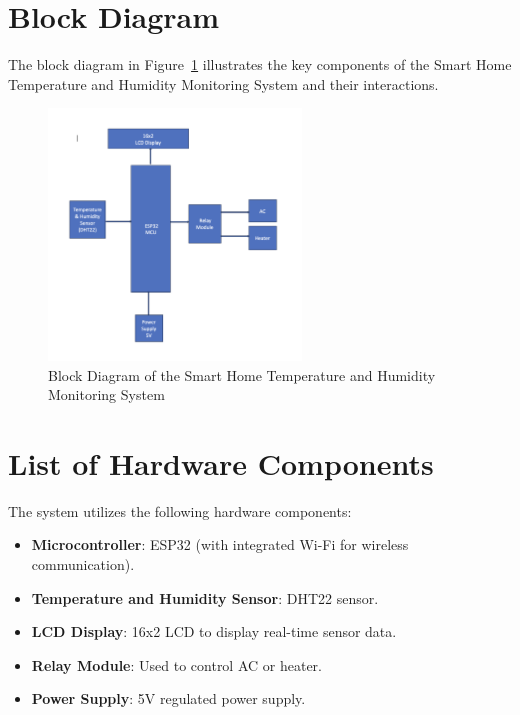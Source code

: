 \documentclass[a4paper,12pt]{article}
\begin{document}
\section{Block Diagram}
The block diagram in Figure~\ref{fig:blockdiagram} illustrates the key components of the Smart Home Temperature and Humidity Monitoring System and their interactions.

\begin{figure}[H]
    \centering
     \includegraphics[width=0.6\textwidth]{BlockDiagram.png} %
    \caption{Block Diagram of the Smart Home Temperature and Humidity Monitoring System}
    \label{fig:blockdiagram}
\end{figure}

\section{List of Hardware Components}
The system utilizes the following hardware components:
\begin{itemize}
    \item \textbf{Microcontroller}: ESP32 (with integrated Wi-Fi for wireless communication).
    \item \textbf{Temperature and Humidity Sensor}: DHT22 sensor.
    \item \textbf{LCD Display}: 16x2 LCD to display real-time sensor data.
    \item \textbf{Relay Module}: Used to control AC or heater.
    \item \textbf{Power Supply}: 5V regulated power supply.
\end{itemize}
\end{document}
